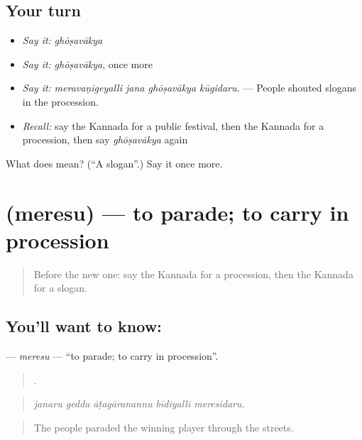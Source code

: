 \subsection*{Your turn}
\begin{itemize}
\raggedright
  \item \emph{Say it:} \emph{ghōṣavākya}
  \item \emph{Say it:} \emph{ghōṣavākya}, once more
  \item \emph{Say it:} \emph{meravaṇigeyalli jana ghōṣavākya kūgidaru.} — People shouted slogans in the procession.
  \item \emph{Recall:} say the Kannada for a public festival, then the Kannada for a procession, then say \emph{ghōṣavākya} again
\end{itemize}

\begin{tcolorbox}[breakable,colback=teal!4,colframe=teal!35!black,title={Before you move on}]
What does  mean? (\textquotedblleft{}A slogan\textquotedblright{}.) Say it once more.
\end{tcolorbox}
\section[\texorpdfstring{\kn{ಮೆರೆಸು} (meresu)}{ಮೆರೆಸು (meresu)}]{ (meresu) — to parade; to carry in procession}

\label{lesson:KA-C359-meresu}



\begin{quote}
Before the new one: say the Kannada for a procession, then the Kannada for a slogan.
\end{quote}

\subsection*{You'll want to know: }
\textbf{} — \emph{meresu} — \textquotedblleft{}to parade; to carry in procession\textquotedblright{}.

\begin{quote}
    .
\end{quote}

\begin{quote}
\emph{janaru gedda āṭagāranannu bīdiyalli meresidaru.}
\end{quote}

\begin{quote}
The people paraded the winning player through the streets.
\end{quote}

